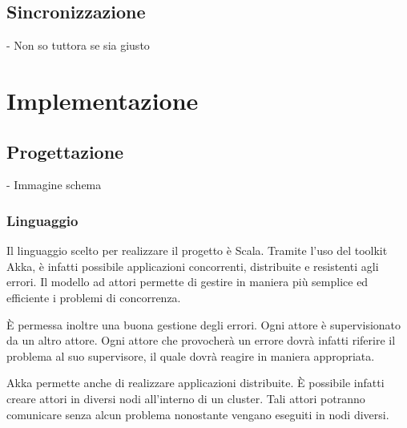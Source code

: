 \documentclass{article}
\newcommand{\Versione}{1.0}
\begin{document}
\subsection{Sincronizzazione}
- Non so tuttora se sia giusto

\newpage

\pagestyle{fancy}

\chead{}
\rhead{
	\color{black}
	\bfseries \textsf{\normalsize v.\Versione\\} 
}

\section{Implementazione}
\subsection{Progettazione}
- Immagine schema
\subsubsection{Linguaggio}
\lettrine[lines=1]{I}{}l linguaggio scelto per realizzare il progetto \`{e} Scala. Tramite l\textquoteright{}uso del toolkit Akka, \`{e} infatti possibile applicazioni concorrenti, distribuite e resistenti agli errori. Il modello ad attori permette di gestire in maniera pi\`{u} semplice ed efficiente i problemi di concorrenza.

\par \`{E} permessa inoltre una buona gestione degli errori. Ogni attore \`{e} supervisionato da un altro attore. Ogni attore che provocher\`{a} un errore dovr\`{a} infatti riferire il problema al suo supervisore, il quale dovr\`{a} reagire in maniera appropriata.
\par Akka permette anche di realizzare applicazioni distribuite. \`{E} possibile infatti creare attori in diversi nodi all\textquoteright{}interno di un cluster. Tali attori potranno comunicare senza alcun problema nonostante vengano eseguiti in nodi diversi.
\end{document}
